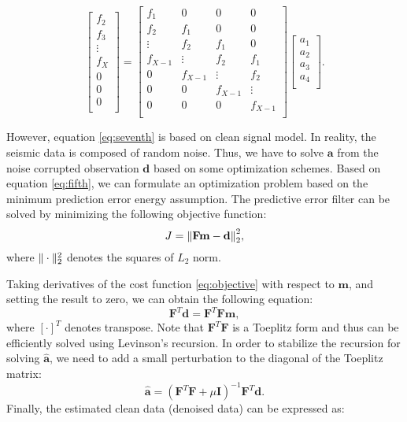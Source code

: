 \begin{equation}
\label{eq:eigth}
\left[ \begin{array}{c}
f_2\\
f_3\\
\vdots\\
f_{X}\\
0\\
0\\
0\\
\end{array}\right]
=
\left[\begin{array}{cccc} 
f_1 & 0 & 0 & 0 \\
f_2 & f_1 & 0 & 0 \\
\vdots &f_2&f_1 & 0 \\
f_{X-1}& \vdots &f_2&f_1\\ 
0&f_{X-1}&\vdots& f_2 \\
0&0&f_{X-1}&\vdots \\
0&0&0&f_{X-1} \\
\end{array}\right] 
\left[ \begin{array}{c}
a_1\\
a_2\\
a_3\\
a_{4}\\
\end{array}\right].
\end{equation}

However, equation \ref{eq:seventh} is based on clean signal model. In reality, the seismic data is composed of random noise. Thus, we have to solve $\mathbf{a}$ from the noise corrupted observation $\mathbf{d}$ based on some optimization schemes. Based on equation \ref{eq:fifth}, we can formulate an optimization problem based on the minimum prediction error energy assumption. The predictive error filter can be solved by minimizing the following objective function:
\begin{equation}
\label{eq:objective}
J={\Arrowvert \mathbf{Fm}-\mathbf{d} \Arrowvert}_2^2,
\end{equation}
where $\Arrowvert\cdot\Arrowvert_2^2$ denotes the squares of $L_2$ norm. 

Taking derivatives of the cost function \ref{eq:objective} with respect to $\mathbf{m}$, and setting the result to zero, we can obtain the following equation:
\begin{equation}
\label{eq:derivative}
\mathbf{F}^T\mathbf{d}=\mathbf{F}^{T}\mathbf{Fm},
\end{equation}
where $[\cdot]^T$ denotes transpose. Note that $\mathbf{F}^T\mathbf{F}$ is a Toeplitz form and thus can be efficiently solved using Levinson's recursion. In order to stabilize the recursion for solving $\hat{\mathbf{a}}$, we need to add a small perturbation to the diagonal of the Toeplitz matrix:
\begin{equation}
\label{eq:solution}
\hat{\mathbf{a}}= (\mathbf{F}^{T}\mathbf{F}+\mu\mathbf{I})^{-1}\mathbf{F}^T\mathbf{d}.
\end{equation}
Finally, the estimated clean data (denoised data) can be expressed as:

